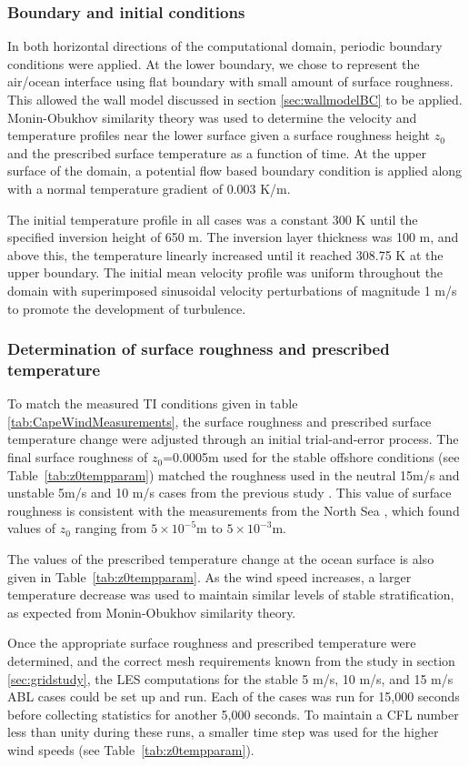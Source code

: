 \subsubsection{Boundary and initial conditions}
In both horizontal directions of the computational domain, periodic
boundary conditions were applied.  At the lower boundary, we chose to
represent the air/ocean interface using flat boundary with small
amount of surface roughness.  This allowed the wall model discussed in
section \ref{sec:wallmodelBC} to be applied.  Monin-Obukhov similarity
theory was used to determine the velocity and temperature profiles
near the lower surface given a surface roughness height $z_0$ and the
prescribed surface temperature as a function of time.  At the upper
surface of the domain, a potential flow based boundary condition is
applied along with a normal temperature gradient of 0.003 K/m.

The initial temperature profile in all cases was a constant 300 K until
the specified inversion height of 650 m.  The inversion layer thickness
was 100 m, and above this, the temperature linearly increased until it
reached 308.75 K at the upper boundary.  The initial mean velocity
profile was uniform throughout the domain with superimposed sinusoidal
velocity perturbations of magnitude 1 m/s to promote the development
of turbulence.

\subsubsection{Determination of surface roughness and prescribed temperature }
To match the measured TI conditions given in table
\ref{tab:CapeWindMeasurements}, the surface roughness and prescribed
surface temperature change were adjusted through an initial
trial-and-error process.  The final surface roughness of $z_0$=0.0005m
used for the stable offshore conditions (see Table~\ref{tab:z0tempparam})
matched the roughness used in the neutral 15m/s and unstable 5m/s and
10 m/s cases from the previous study \cite{cheung2020large}.  This
value of surface roughness is consistent with the measurements from
the North Sea \cite{taylor2001dependence}, which found values of $z_0$
ranging from $5 \times 10^{-5}$m to $5\times 10^{-3}$m.

The values of the prescribed temperature change at the ocean surface
is also given in Table~\ref{tab:z0tempparam}.  As the wind
speed increases, a larger temperature decrease was used to maintain
similar levels of stable stratification, as expected from
Monin-Obukhov similarity theory.

Once the appropriate surface roughness and prescribed temperature were
determined, and the correct mesh requirements known from the study in
section \ref{sec:gridstudy}, the LES computations for the stable 5 m/s,
10 m/s, and 15 m/s ABL cases could be set up and run.  Each of the cases
was run for 15,000 seconds before collecting statistics for another
5,000 seconds.  To maintain a CFL number less than unity during these
runs, a smaller time step was used for the higher wind speeds (see
Table~\ref{tab:z0tempparam}).
